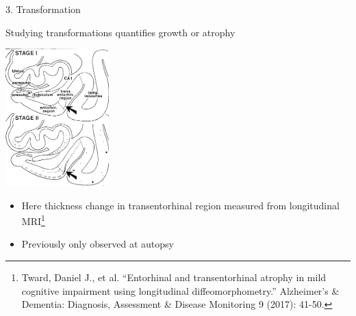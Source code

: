 \documentclass{beamer}
\begin{document}
\begin{frame}{3. Transformation}

Studying transformations quantifies growth or atrophy %
\vspace{-0.5em}
\begin{center}
%
%
\includegraphics[width=0.3\textwidth]{braak12.png}
\end{center}
\vspace{-1em}
\begin{itemize}
\item Here thickness change in transentorhinal region measured from longitudinal MRI\footnote{Tward, Daniel J., et al. ``Entorhinal and transentorhinal atrophy in mild cognitive impairment using longitudinal diffeomorphometry.'' Alzheimer's \& Dementia: Diagnosis, Assessment \& Disease Monitoring 9 (2017): 41-50.}
\item Previously only observed at autopsy
\end{itemize}

\end{frame}
\end{document}
